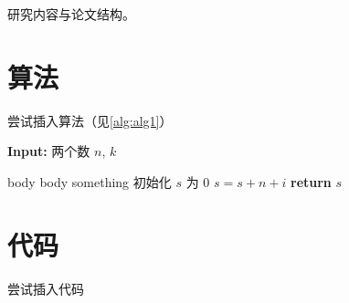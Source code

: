 \documentclass[oneside,a4paper,12pt,AutoFakeBold]{book}%
\renewcommand{\COMMENT}[2][.5\linewidth]{%
  \leavevmode\hfill\makebox[#1][l]{//~#2}}
\begin{document}
研究内容\cite{erdHos1960evolution,konect:socialcomputing,konect}与论文结构\cite{Harrison1993,xiuwu2002,Erickson2003,Auroux2002}。

\chapter{算法}
尝试插入算法（见\autoref{alg:alg1}）

\begin{algorithm}[h]
    \textbf{Input:} 两个数 $n$, $k$
    \begin{algorithmic}[1]
            \State body
        \EndProcedure
            \State body
            \State \Return something
        \EndFunction
        \Statex
        \State 初始化 $s$ 为 $0$ \label{algline:init}
            \COMMENT{\textbf{循环}}
        \label{algline:for} 
                \State $s = s + n + i$
            \EndIf 
        \EndFor \label{algline:endfor}
        \State \textbf{return} $s$ \label{algline:return} 
    \end{algorithmic}
    \caption{sum($n$, $k$)}
    \label{alg:alg1}
\end{algorithm}

\chapter{代码}
尝试插入代码
\end{document}
